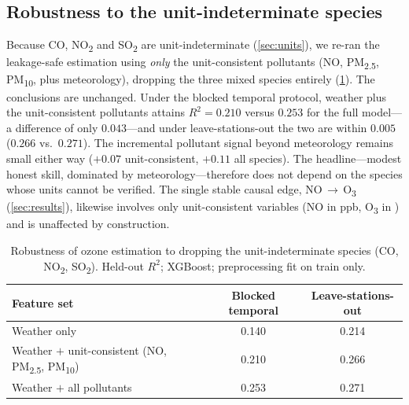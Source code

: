 \subsection{Robustness to the unit-indeterminate species}
\label{sec:robust}
Because CO, NO\textsubscript{2} and SO\textsubscript{2} are unit-indeterminate
(\cref{sec:units}), we re-ran the leakage-safe estimation using \emph{only} the
unit-consistent pollutants (NO, PM\textsubscript{2.5}, PM\textsubscript{10}, plus
meteorology), dropping the three mixed species entirely (\cref{tab:robust}). The
conclusions are unchanged. Under the blocked temporal protocol, weather plus the
unit-consistent pollutants attains $R^2=0.210$ versus $0.253$ for the full model---a
difference of only $0.043$---and under leave-stations-out the two are within $0.005$
($0.266$ vs.\ $0.271$). The incremental pollutant signal beyond meteorology remains
small either way ($+0.07$ unit-consistent, $+0.11$ all species). The headline---modest
honest skill, dominated by meteorology---therefore does not depend on the species whose
units cannot be verified. The single stable causal edge, NO\,$\rightarrow$\,O\textsubscript{3}
(\cref{sec:results}), likewise involves only unit-consistent variables (NO in ppb,
O\textsubscript{3} in \ugm{}) and is unaffected by construction.

\begin{table}[t]
  \centering
  \caption{Robustness of ozone estimation to dropping the unit-indeterminate species
  (CO, NO\textsubscript{2}, SO\textsubscript{2}). Held-out $R^2$; XGBoost; preprocessing
  fit on train only.}
  \label{tab:robust}
  \begin{tabular}{lcc}
    \toprule
    Feature set & Blocked temporal & Leave-stations-out \\
    \midrule
    Weather only                                   & 0.140 & 0.214 \\
    Weather $+$ unit-consistent (NO, PM\textsubscript{2.5}, PM\textsubscript{10}) & 0.210 & 0.266 \\
    Weather $+$ all pollutants                     & 0.253 & 0.271 \\
    \bottomrule
  \end{tabular}
\end{table}

